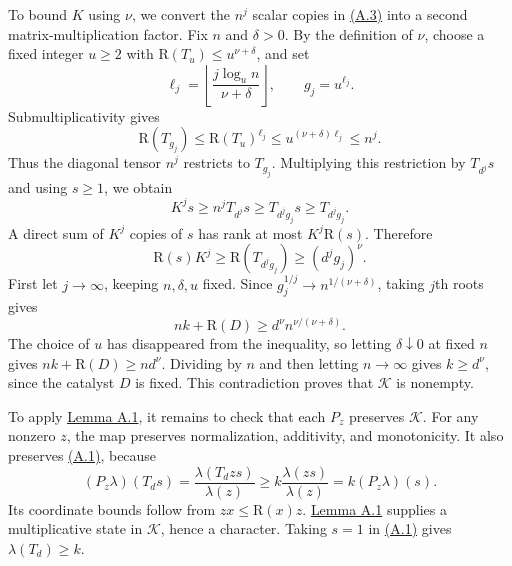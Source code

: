 \begin{amsthmproof}
To bound $K$ using $\nu$, we convert the $n^j$ scalar copies in \hyperlink{p107.eq.A.3}{(A.3)} into a second matrix-multiplication factor. Fix $n$ and $\delta>0$. By the definition of $\nu$, choose a fixed integer $u\ge2$ with $\mathrm R(T_u)\le u^{\nu+\delta}$, and set
\[
\ell_j=\left\lfloor\frac{j\log_u n}{\nu+\delta}\right\rfloor,\qquad g_j=u^{\ell_j}.
\]
Submultiplicativity gives
\[
\mathrm R(T_{g_j})\le\mathrm R(T_u)^{\ell_j}\le u^{(\nu+\delta)\ell_j}\le n^j.
\]
Thus the diagonal tensor $n^j$ restricts to $T_{g_j}$. Multiplying this restriction by $T_{d^j}s$ and using $s\ge1$, we obtain
\[
K^js\ge n^jT_{d^j}s\ge T_{d^jg_j}s\ge T_{d^jg_j}.
\]
A direct sum of $K^j$ copies of $s$ has rank at most $K^j\mathrm R(s)$. Therefore
\[
\mathrm R(s)K^j\ge\mathrm R(T_{d^jg_j})\ge(d^jg_j)^\nu.
\]
First let $j\to\infty$, keeping $n,\delta,u$ fixed. Since $g_j^{1/j}\to n^{1/(\nu+\delta)}$, taking $j$th roots gives
\[
nk+\mathrm R(D)\ge d^\nu n^{\nu/(\nu+\delta)}.
\]
The choice of $u$ has disappeared from the inequality, so letting $\delta\downarrow0$ at fixed $n$ gives $nk+\mathrm R(D)\ge nd^\nu$. Dividing by $n$ and then letting $n\to\infty$ gives $k\ge d^\nu$, since the catalyst $D$ is fixed. This contradiction proves that $\mathcal K$ is nonempty.

To apply \hyperlink{p107.result.A.1}{Lemma A.1}, it remains to check that each $P_z$ preserves $\mathcal K$. For any nonzero $z$, the map preserves normalization, additivity, and monotonicity. It also preserves \hyperlink{p107.eq.A.1}{(A.1)}, because
\[
(P_z\lambda)(T_ds)=\frac{\lambda(T_dzs)}{\lambda(z)}\ge k\frac{\lambda(zs)}{\lambda(z)}=k(P_z\lambda)(s).
\]
Its coordinate bounds follow from $zx\le\mathrm R(x)z$. \hyperlink{p107.result.A.1}{Lemma A.1} supplies a multiplicative state in $\mathcal K$, hence a character. Taking $s=1$ in \hyperlink{p107.eq.A.1}{(A.1)} gives $\lambda(T_d)\ge k$.
\end{amsthmproof}
